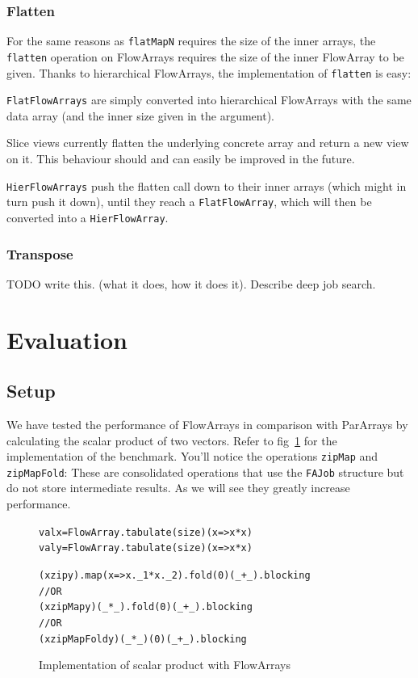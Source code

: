 \documentclass[runningheads,a4paper,fleqn]{llncs}
\begin{document}
\subsubsection{Flatten}
For the same reasons as \texttt{flatMapN} requires the size of the
inner arrays, the \texttt{flatten} operation on FlowArrays requires
the size of the inner FlowArray to be given. Thanks to hierarchical
FlowArrays, the implementation of \texttt{flatten} is easy:

\texttt{FlatFlowArrays} are simply converted into hierarchical
FlowArrays with the same data array (and the inner size given in the
argument).

Slice views currently flatten the underlying concrete array and return
a new view on it. This behaviour should and can easily be improved in
the future.

\texttt{HierFlowArrays} push the flatten call down to their inner
arrays (which might in turn push it down), until they reach a
\texttt{FlatFlowArray}, which will then be converted into a
\texttt{HierFlowArray}.

\subsubsection{Transpose}
TODO write this. (what it does, how it does it). Describe deep job
search.

\section{Evaluation}
\label{sec:evaluation}

\subsection{Setup}

We have tested the performance of FlowArrays in comparison with
ParArrays by calculating the scalar product of two vectors. Refer to
fig~\ref{fig:scalar-product} for the implementation of the
benchmark. You'll notice the operations \texttt{zipMap} and
\texttt{zipMapFold}: These are consolidated operations that use the
\texttt{FAJob} structure but do not store intermediate results. As we
will see they greatly increase performance.

\begin{figure}
\begin{minipage}[t]{6cm}
\begin{alltt}
{\scriptsize
val x = FlowArray.tabulate(size)(x => x*x)
val y = FlowArray.tabulate(size)(x => x*x)

(x zip y).map(x => x._1 * x._2).fold(0)(_ + _).blocking
// OR
(x zipMap y)(_ * _).fold(0)(_ + _).blocking
// OR
(x zipMapFold y)(_ * _)(0)(_ + _).blocking
}
\end{alltt}
\end{minipage}
\caption{Implementation of scalar product with FlowArrays}
\label{fig:scalar-product}
\end{figure}
\end{document}
